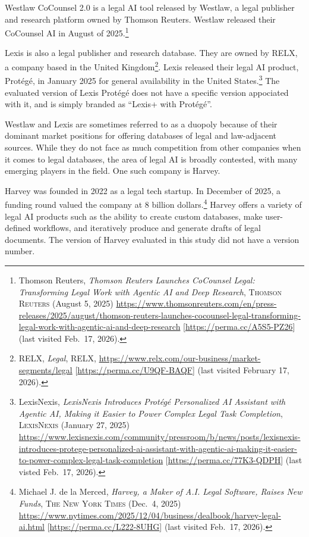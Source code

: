 \documentclass[
]{article}
\begin{document}
Westlaw CoCounsel 2.0 is a legal AI tool released by Westlaw, a legal publisher and research platform owned by Thomson Reuters. Westlaw released their CoCounsel AI in August of 2025.\footnote{Thomson Reuters, \emph{Thomson Reuters Launches CoCounsel Legal: Transforming Legal Work with Agentic AI and Deep Research}, \textsc{Thomson Reuters} (August 5, 2025) \url{https://www.thomsonreuters.com/en/press-releases/2025/august/thomson-reuters-launches-cocounsel-legal-transforming-legal-work-with-agentic-ai-and-deep-research} {[}\url{https://perma.cc/A5S5-PZ26}{]} (last visited Feb.~17, 2026).}

Lexis is also a legal publisher and research database. They are owned by RELX, a company based in the United Kingdom\footnote{RELX, \emph{Legal}, \textsc{RELX}, \url{https://www.relx.com/our-business/market-segments/legal} {[}\url{https://perma.cc/U9QF-BAQF}{]} (last visited February 17, 2026).}. Lexis released their legal AI product, Protégé, in January 2025 for general availability in the United States.\footnote{LexisNexis, \emph{LexisNexis Introduces Protégé Personalized AI Assistant with Agentic AI, Making it Easier to Power Complex Legal Task Completion}, \textsc{LexisNexis} (January 27, 2025) \url{https://www.lexisnexis.com/community/pressroom/b/news/posts/lexisnexis-introduces-protege-personalized-ai-assistant-with-agentic-ai-making-it-easier-to-power-complex-legal-task-completion} {[}\url{https://perma.cc/77K3-QDPH}{]} (last visted Feb.~17, 2026).} The evaluated version of Lexis Protégé does not have a specific version appociated with it, and is simply branded as ``Lexis+ with Protégé''.

Westlaw and Lexis are sometimes referred to as a duopoly because of their dominant market positions for offering databases of legal and law-adjacent sources. While they do not face as much competition from other companies when it comes to legal databases, the area of legal AI is broadly contested, with many emerging players in the field. One such company is Harvey.

Harvey was founded in 2022 as a legal tech startup. In December of 2025, a funding round valued the company at 8 billion dollars.\footnote{Michael J. de la Merced, \emph{Harvey, a Maker of A.I. Legal Software, Raises New Funds}, \textsc{The New York Times} (Dec.~4, 2025) \url{https://www.nytimes.com/2025/12/04/business/dealbook/harvey-legal-ai.html} {[}\url{https://perma.cc/L222-8UHG}{]} (last visited Feb.~17, 2026).} Harvey offers a variety of legal AI products such as the ability to create custom databases, make user-defined workflows, and iteratively produce and generate drafts of legal documents. The version of Harvey evaluated in this study did not have a version number.
\end{document}
